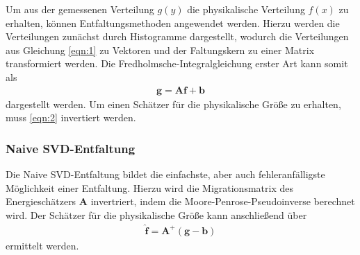 Um aus der gemessenen Verteilung $g(y)$ die physikalische Verteilung $f(x)$ zu erhalten, können Entfaltungsmethoden angewendet werden.
Hierzu werden die Verteilungen zunächst durch Histogramme dargestellt, wodurch die Verteilungen aus Gleichung \eqref{eqn:1} zu Vektoren und der Faltungskern zu einer Matrix transformiert werden. Die Fredholmsche-Integralgleichung erster Art kann somit als 
\begin{align}
	{\pmb{g}} = \pmb{A}{\pmb{f}} + {\pmb{b}}
	\label{eqn:2}
\end{align}
dargestellt werden.
Um einen Schätzer für die physikalische Größe zu erhalten, muss \eqref{eqn:2} invertiert werden. 


\subsubsection{Naive SVD-Entfaltung}
Die Naive SVD-Entfaltung bildet die einfachste, aber auch fehleranfälligste Möglichkeit einer Entfaltung. 
Hierzu wird die Migrationsmatrix des Energieschätzers $\pmb{A}$ invertriert, indem die Moore-Penrose-Pseudoinverse berechnet wird. Der Schätzer für die physikalische Größe kann anschließend über
\begin{align}
	\hat{{\pmb{f}}} = \pmb{A}^{+}({\pmb{g}} - {\pmb{b}})
	\label{eqn:NSVD}
\end{align}
ermittelt werden.

